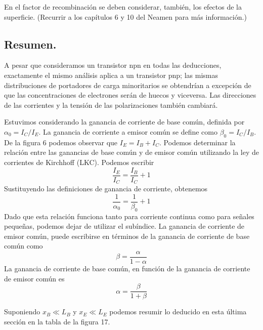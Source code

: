 \documentclass[12pt,a4paper]{article}
\begin{document}
En el factor de recombinación se deben considerar, también, los efectos de la superficie. (Recurrir a los capítulos 6 y 10 del Neamen para más información.)

\subsection{Resumen.}

A pesar que consideramos un transistor npn en todas las deducciones, exactamente el mismo análisis aplica a un transistor pnp; las mismas distribuciones de portadores de carga minoritarios se obtendrían a excepción de que las concentraciones de electrones serán de huecos y viceversa. Las direcciones de las corrientes y la tensión de las polarizaciones también cambiará.

Estuvimos considerando la ganancia de corriente de base común, definida por $\alpha _{0}=I_{C}/I_{E}$. La ganancia de corriente a emisor común se define como $\beta _{0}=I_{C}/I_{B}$. De la figura 6 podemos observar que $I_{E}=I_{B}+I_{C}$. Podemos determinar la relación entre las ganancias de base común y de emisor común utilizando la ley de corrientes de Kirchhoff (LKC). Podemos escribir
\[ \frac{I_{E}}{I_{C}}=\frac{I_{B}}{I_{C}}+1 \]
Sustituyendo las definiciones de ganancia de corriente, obtenemos
\[ \frac{1}{\alpha _{0}}=\frac{1}{\beta _{0}}+1 \]
Dado que esta relación funciona tanto para corriente continua como para señales pequeñas, podemos dejar de utilizar el subíndice. La ganancia de corriente de emisor común, puede escribirse en términos de la ganancia de corriente de base común como
\[ \beta = \frac{\alpha}{1-\alpha} \]
La ganancia de corriente de base común, en función de la ganancia de corriente de emisor común es
\[ \alpha = \frac{\beta}{1+\beta} \]

Suponiendo $x_{B} \ll L_{B}$ y $x_{E} \ll L_{E}$ podemos resumir lo deducido en esta última sección en la tabla de la figura 17.
\end{document}
